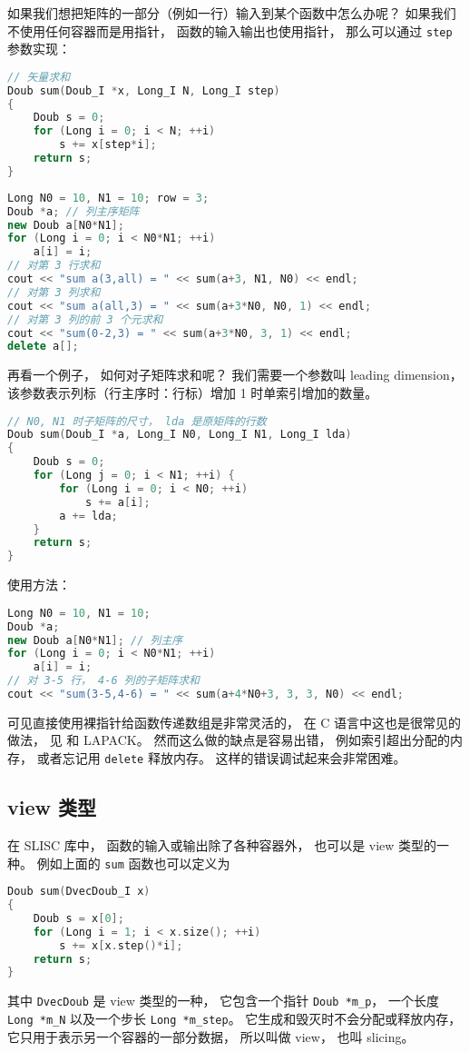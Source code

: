 
\begin{issues}
\issueDraft
\end{issues}


如果我们想把矩阵的一部分（例如一行）输入到某个函数中怎么办呢？ 如果我们不使用任何容器而是用指针， 函数的输入输出也使用指针， 那么可以通过 \verb`step` 参数实现：
\begin{lstlisting}[language=cpp]
// 矢量求和
Doub sum(Doub_I *x, Long_I N, Long_I step)
{
    Doub s = 0;
    for (Long i = 0; i < N; ++i)
        s += x[step*i];
    return s;
}
\end{lstlisting}

\begin{lstlisting}[language=cpp]
Long N0 = 10, N1 = 10; row = 3;
Doub *a; // 列主序矩阵
new Doub a[N0*N1];
for (Long i = 0; i < N0*N1; ++i)
    a[i] = i;
// 对第 3 行求和
cout << "sum a(3,all) = " << sum(a+3, N1, N0) << endl;
// 对第 3 列求和
cout << "sum a(all,3) = " << sum(a+3*N0, N0, 1) << endl;
// 对第 3 列的前 3 个元求和
cout << "sum(0-2,3) = " << sum(a+3*N0, 3, 1) << endl;
delete a[];
\end{lstlisting}
再看一个例子， 如何对子矩阵求和呢？ 我们需要一个参数叫 leading dimension， 该参数表示列标（行主序时：行标）增加 1 时单索引增加的数量。
\begin{lstlisting}[language=cpp]
// N0, N1 时子矩阵的尺寸， lda 是原矩阵的行数
Doub sum(Doub_I *a, Long_I N0, Long_I N1, Long_I lda)
{
    Doub s = 0;
    for (Long j = 0; i < N1; ++i) {
        for (Long i = 0; i < N0; ++i)
            s += a[i];
        a += lda;
    }
    return s;
}
\end{lstlisting}
使用方法：
\begin{lstlisting}[language=cpp]
Long N0 = 10, N1 = 10;
Doub *a;
new Doub a[N0*N1]; // 列主序
for (Long i = 0; i < N0*N1; ++i)
    a[i] = i;
// 对 3-5 行， 4-6 列的子矩阵求和
cout << "sum(3-5,4-6) = " << sum(a+4*N0+3, 3, 3, N0) << endl;
\end{lstlisting}
可见直接使用裸指针给函数传递数组是非常灵活的， 在 C 语言中这也是很常见的做法， 见  和 LAPACK。 然而这么做的缺点是容易出错， 例如索引超出分配的内存， 或者忘记用 \verb`delete` 释放内存。 这样的错误调试起来会非常困难。

\subsection{view 类型}
在 SLISC 库中， 函数的输入或输出除了各种容器外， 也可以是 view 类型的一种。 例如上面的 \verb`sum` 函数也可以定义为
\begin{lstlisting}[language=cpp]
Doub sum(DvecDoub_I x)
{
    Doub s = x[0];
    for (Long i = 1; i < x.size(); ++i)
        s += x[x.step()*i];
    return s;
}
\end{lstlisting}
其中 \verb`DvecDoub` 是 view 类型的一种， 它包含一个指针 \verb`Doub *m_p`， 一个长度 \verb`Long *m_N` 以及一个步长 \verb`Long *m_step`。 它生成和毁灭时不会分配或释放内存， 它只用于表示另一个容器的一部分数据， 所以叫做 view， 也叫 slicing。

